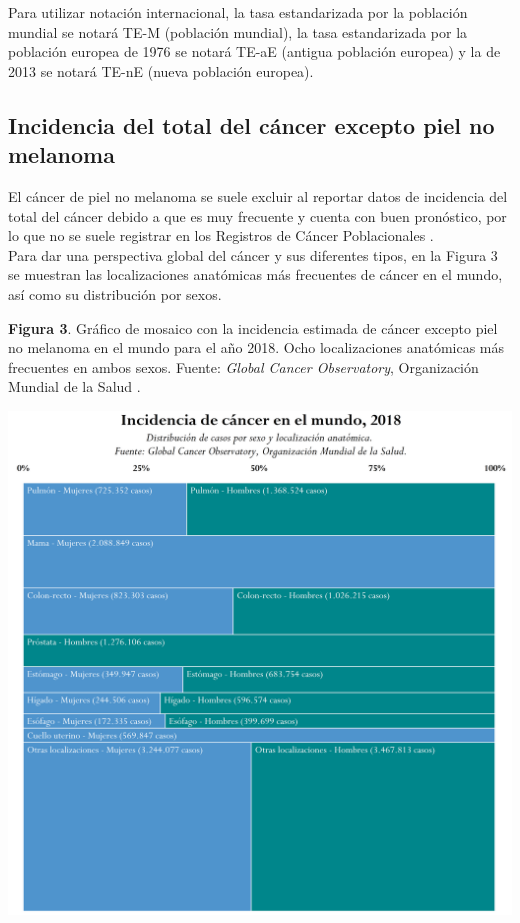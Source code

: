 Para utilizar notación internacional, la tasa estandarizada por la población mundial se notará TE-M (población mundial), la tasa estandarizada por la población europea de 1976 se notará TE-aE (antigua población europea) y la de 2013 se notará TE-nE (nueva población europea).

\subsection{Incidencia del total del cáncer excepto piel no melanoma}

El cáncer de piel no melanoma se suele excluir al reportar datos de incidencia del total del cáncer debido a que es muy frecuente y cuenta con buen pronóstico, por lo que no se suele registrar en los Registros de Cáncer Poblacionales \cite{Gordon2013, Madan2010}.\\

Para dar una perspectiva global del cáncer y sus diferentes tipos, en la Figura 3 se muestran las localizaciones anatómicas más frecuentes de cáncer en el mundo, así como su distribución por sexos.

\begin{center}
	\textbf{Figura 3}. Gráfico de mosaico con la incidencia estimada de cáncer excepto piel no melanoma en el mundo para el año 2018. Ocho localizaciones anatómicas más frecuentes en ambos sexos. Fuente: \textit{Global Cancer Observatory}, Organización Mundial de la Salud \cite{GCO}.
\end{center}
\begin{center}
	\includegraphics[width=.85\textwidth]{figuras/03_marimekko_gco_incidencia.png} 
\end{center}

